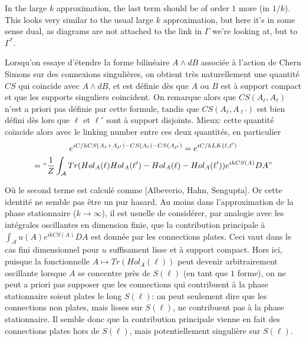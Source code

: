 \documentclass[10pt]{article}
\begin{document}
In the large $k$ approximation, the last term should be of order $1$ more (in $1/k$). This looks very similar to the usual large $k$ approximation, but here it's in some sense dual, as diagrams are not attached to the link in $ \Gamma$ we're looking at, but to $\Gamma^*$.

\newpage





















Lorsqu'on essaye d'étendre la forme bilinéaire $A\wedge dB$ associée à l'action de Chern Simons sur des connexions singulières, on obtient très naturellement une quantité $CS$ qui coincide avec $A\wedge dB$, et est définie dès que $A$ ou $B$ est à support compact et que les supports singuliers coincident. On remarque alors que $CS(A_\ell,A_\ell)$ n'est a priori pas définie par cette formule, tandis que $CS(A_\ell,A_{\ell'})$ est bien défini dès lors que $\ell$ et $\ell'$ sont à support disjoints. Mieux:  cette quantité coincide alors avec le linking number entre ces deux quantités, en particulier
\begin{multline}
   e^{i C/k CS(A_\ell+A_{\ell'})-CS(A_\ell)-CS(A_{\ell'})}=
   e^{i C/k LK(\ell,\ell')}\\
   =  ``\frac{1}{Z}\int_{\mathcal{A}} Tr(Hol_A(\ell)Hol_A(\ell')-Hol_A(\ell)-Hol_A(\ell')) e^{i k CS(A)} DA "
\end{multline}

Où le second terme est calculé comme [Albeverio, Hahn, Sengupta]. Or cette identité ne semble pas être un pur hasard. Au moins dans l'approximation de la phase stationnaire ($k\to \infty$), il est usuelle de considérer, par analogie avec les intégrales oscillantes en dimension finie,  que la contribution principale à $\int_{\mathcal{A}} u(A) e^{i k CS(A)} DA $ est donnée par les connections plates. Ceci vaut dans le cas fini dimensionnel pour $u$ suffisament lisse et à support compact. Hors ici, puisque la fonctionnelle $A\mapsto Tr(Hol_A(\ell))$ peut devenir arbitrairement oscillante lorsque $A$ se concentre près de $S(\ell)$ (en tant que $1$ forme), on ne peut a priori pas supposer que les connections qui contribuent à la phase stationnaire soient plates le long $S(\ell)$: on peut seulement dire que les connections non plates, mais lisses sur $S(\ell)$, ne contribuent pas à la phase stationnaire. Il semble donc que la contribution principale vienne en fait des connections plates hors de $S(\ell)$, mais potentiellement singulière sur $S(\ell)$.
\end{document}
